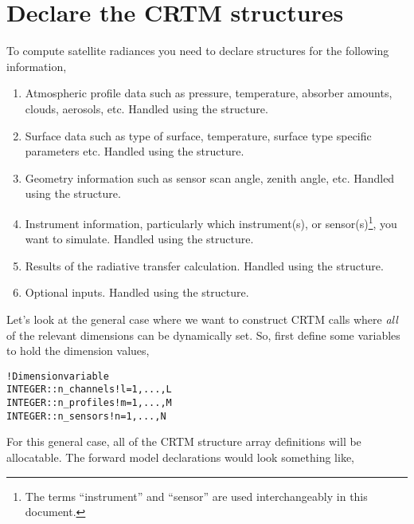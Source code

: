 \section{Declare the CRTM structures}
\label{sec:declare_step}

To compute satellite radiances you need to declare structures for the following information,\vspace{-2ex}

\begin{enumerate}
  \item Atmospheric profile data such as pressure, temperature, absorber amounts, clouds, aerosols, etc. Handled using the \hyperref[sec:atmosphere_structure]{\Atmosphere} structure.
  \item Surface data such as type of surface, temperature, surface type specific parameters etc. Handled using the \hyperref[sec:surface_structure]{\Surface} structure.
  \item Geometry information such as sensor scan angle, zenith angle, etc. Handled using the \hyperref[sec:geometry_structure]{\Geometry} structure.
  \item Instrument information, particularly which instrument(s), or sensor(s)\footnote{The terms ``instrument'' and ``sensor'' are used interchangeably in this document.}, you want to simulate. Handled using the \hyperref[sec:channelinfo_structure]{\ChannelInfo} structure.
  \item Results of the radiative transfer calculation. Handled using the \hyperref[sec:rtsolution_structure]{\RTSolution} structure.
  \item Optional inputs. Handled using the \hyperref[sec:options_structure]{\Options} structure.
\end{enumerate}

Let's look at the general case where we want to construct CRTM calls where \emph{all} of the relevant dimensions can be dynamically set. So, first define some variables to hold the dimension values,

\begin{alltt}
  ! Dimension variable
  INTEGER :: n_channels  ! l = 1, ... , L
  INTEGER :: n_profiles  ! m = 1, ... , M
  INTEGER :: n_sensors   ! n = 1, ... , N\end{alltt}

For this general case, all of the CRTM structure array definitions will be allocatable. The forward model declarations would look something like,

